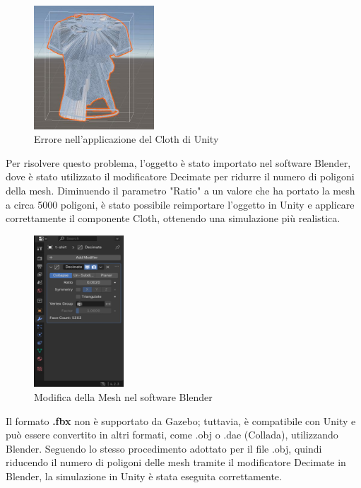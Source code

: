 \documentclass[11pt]{report}
\begin{document}
\begin{figure}[H]
    \centering
    \includegraphics[width=0.4\textwidth]{images/cloth_error.PNG}
    \caption{Errore nell'applicazione del Cloth di Unity}
    \label{fig:cloth_error}
\end{figure}

Per risolvere questo problema, l'oggetto è stato importato nel software Blender, dove è stato utilizzato il modificatore Decimate per ridurre il numero di poligoni della mesh. Diminuendo il parametro "Ratio" a un valore che ha portato la mesh a circa 5000 poligoni, è stato possibile reimportare l'oggetto in Unity e applicare correttamente il componente Cloth, ottenendo una simulazione più realistica.

\begin{figure}[H]
    \centering
    \includegraphics[width=0.3\textwidth]{images/blender_ratio.PNG}
    \caption{Modifica della Mesh nel software Blender}
    \label{fig:blender_ratio}
\end{figure}

Il formato \textbf{.fbx} non è supportato da Gazebo; tuttavia, è compatibile con Unity e può essere convertito in altri formati, come .obj o .dae (Collada), utilizzando Blender. Seguendo lo stesso procedimento adottato per il file .obj, quindi riducendo il numero di poligoni delle mesh tramite il modificatore Decimate in Blender, la simulazione in Unity è stata eseguita correttamente.
\end{document}
